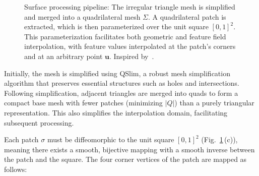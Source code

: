 \begin{figure}[ht]
  \caption{Surface processing pipeline: The irregular triangle mesh is simplified and merged into a quadrilateral mesh $\Sigma$. A quadrilateral patch is extracted, which is then parameterized over the unit square $[0,1]^2$. This parameterization facilitates both geometric and feature field interpolation, with feature values interpolated at the patch's corners and at an arbitrary point $\bm{u}$. Inspired by~\cite{sivaram2024}.}
  \label{fig:surface_processing_pipeline}
\end{figure}





Initially, the mesh is simplified using QSlim, a robust mesh simplification algorithm that preserves essential structures such as holes and intersections. 
Following simplification, adjacent triangles are merged into quads to form a compact base mesh with fewer patches (minimizing $|Q|$) than a purely triangular representation. 
This also simplifies the interpolation domain, facilitating subsequent processing.

Each patch $\sigma$ must be diffeomorphic to the unit square $[0,1]^2$ (Fig.~\ref{fig:surface_processing_pipeline}\,(c)), meaning there exists a smooth, bijective mapping with a smooth inverse between the patch and the square. 
The four corner vertices of the patch are mapped as follows:

